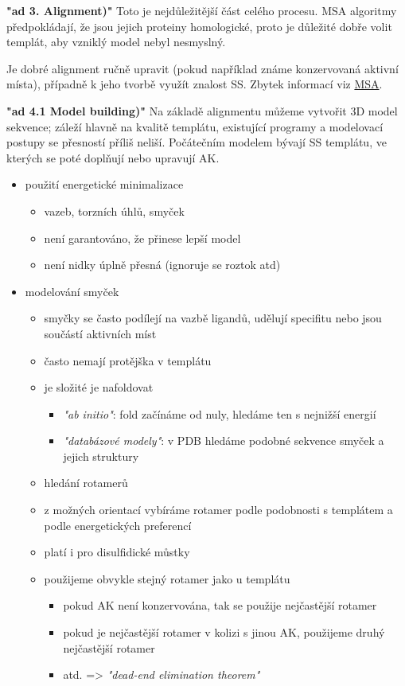 \documentclass[DIV=8]{scrreprt}
\begin{document}
\textbf{"ad 3. Alignment)"} Toto je nejdůležitější část celého procesu. MSA algoritmy předpokládají, že jsou jejich proteiny homologické, proto je důležité dobře volit templát, aby vzniklý model nebyl nesmyslný.

Je dobré alignment ručně upravit (pokud například známe konzervovaná aktivní místa), případně k jeho tvorbě využít znalost SS. Zbytek informací viz \href{#Multiple sequence alignment}{MSA}.

\textbf{"ad 4.1 Model building)"} Na základě alignmentu můžeme vytvořit 3D model sekvence; záleží hlavně na kvalitě templátu, existující programy a modelovací postupy se přesností příliš neliší. Počátečním modelem bývají SS templátu, ve kterých se poté doplňují nebo upravují AK.

\begin{itemize}
    \item použití energetické minimalizace
\begin{itemize}
    \item vazeb, torzních úhlů, smyček
    \item není garantováno, že přinese lepší model
    \item není nidky úplně přesná (ignoruje se roztok atd)
\end{itemize}

    \item modelování smyček
\begin{itemize}
    \item smyčky se často podílejí na vazbě ligandů, udělují specifitu nebo jsou součástí aktivních míst
    \item často nemají protějška v templátu
    \item je složité je nafoldovat
\begin{itemize}
    \item \emph{"ab initio"}: fold začínáme od nuly, hledáme ten s nejnižší energií
    \item \emph{"databázové modely"}: v PDB hledáme podobné sekvence smyček a jejich struktury
\end{itemize}

    \item hledání rotamerů
    \item z možných orientací vybíráme rotamer podle podobnosti s templátem a podle energetických preferencí
    \item platí i pro disulfidické můstky
    \item použijeme obvykle stejný rotamer jako u templátu
\begin{itemize}
    \item pokud AK není konzervována, tak se použije nejčastější rotamer
    \item pokud je nejčastější rotamer v kolizi s jinou AK, použijeme druhý nejčastější rotamer
    \item atd. => \emph{"dead-end elimination theorem"}
\end{itemize}

\end{itemize}

\end{itemize}
\end{document}
